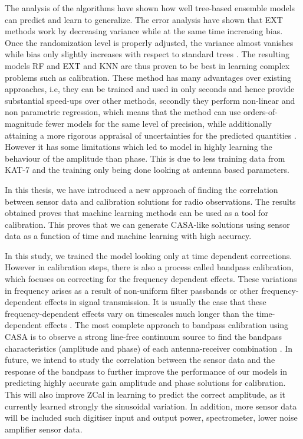 The analysis of the algorithms have shown how well tree-based ensemble models can predict and learn to generalize. The error
analysis have shown that EXT methods work by decreasing variance while at the same time increasing bias. Once the randomization level is properly adjusted, the variance almost vanishes while bias only slightly increases with respect to standard trees \citep{geurts2006extremely}. The resulting models RF and EXT and KNN are thus proven to be best in learning complex problems such as calibration. These method  has many advantages over
existing approaches, i.e, they can be trained
and used in only seconds and hence provide substantial
speed-ups over other methods, secondly they perform non-linear and non parametric regression, which means that the method can
use orders-of-magnitude fewer models for the same level
of precision, while additionally attaining a more rigorous
appraisal of uncertainties for the predicted quantities \citep{bellinger2016fundamental}. However it has some limitations which led to model in highly learning the behaviour of the amplitude than phase. This is due to less training data from KAT-7 and the training only being done looking at antenna based parameters. 

In this thesis, we have introduced a new approach of finding the correlation between sensor data and calibration solutions for radio observations. The results obtained proves that machine learning  methods can be used as a tool for calibration. This proves that we can generate CASA-like solutions using sensor data as a function of time and machine learning with high accuracy.

In this study, we trained the model looking only at time dependent corrections. However in calibration steps, there is also a process called bandpass calibration, which focuses on correcting for the frequency dependent effects. These variations in frequency arises as a result of non-uniform filter passbands or other frequency-dependent effects in signal transmission. It is usually the case that these frequency-dependent effects vary on timescales much longer than the time-dependent effects \citep{editioncasa}. The most complete approach to bandpass calibration using CASA is to observe a strong line-free continuum source to find the bandpass characteristics (amplitude and phase) of each antenna-receiver combination \citep{editioncasa}. In future, we intend to study the correlation between the sensor data and the response of the bandpass to further improve the performance of our models in predicting highly accurate gain amplitude and phase solutions for calibration. This will also improve ZCal in learning to predict the correct amplitude, as it currently learned strongly the sinusoidal variation. In addition, more sensor data will be included such digitiser input and output power, spectrometer, lower noise amplifier sensor data.  









